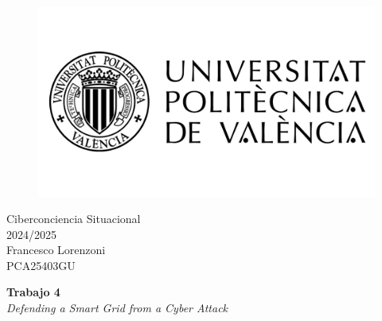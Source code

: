\begin{titlepage}
   \begin{figure}
      \vspace{50mm}
       \centering
       \includegraphics[keepaspectratio=true,width=0.40\columnwidth]{images/upvLogo.png}
   \end{figure}
   
   \vspace{40mm}
   \begin{center}
       \LARGE{Ciberconciencia Situacional}
       \vspace{2.5mm}
       \\ \large{2024/2025}
       \vspace{5mm}
       \\ \large{Francesco Lorenzoni\\\textsc{PCA25403GU}}
    \end{center}
   
   \begin{center}
      \vspace{10mm}
       {\LARGE{\textbf{Trabajo 4}\\ \vspace{5mm}
       \textit{Defending a Smart Grid from a Cyber Attack}}}
       
   \end{center}
\end{titlepage}